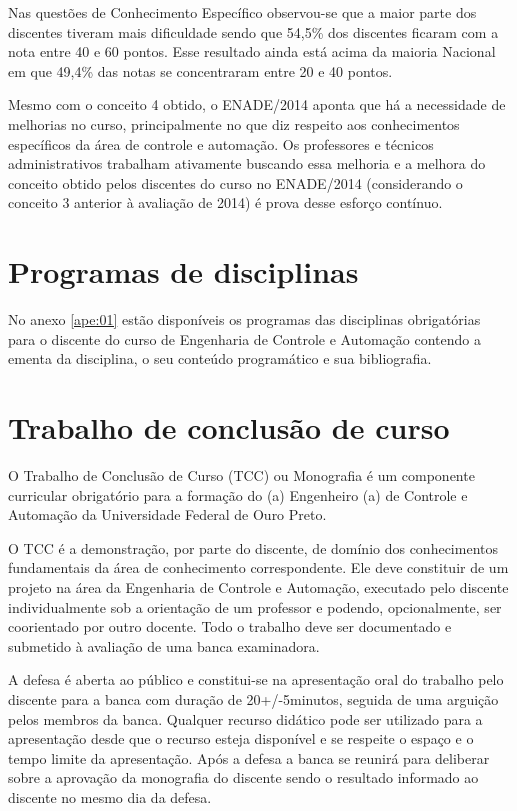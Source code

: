 \documentclass[
	12pt,				%
	openright,			%
	oneside,			%
	a4paper,			%
	english,			%
	brazil				%
	]{abntex2}
\begin{document}
Nas questões de Conhecimento Específico observou-se que a maior parte dos discentes tiveram mais dificuldade sendo que 54,5\% dos discentes ficaram com a nota entre 40 e 60 pontos. Esse resultado ainda está acima da maioria Nacional em que 49,4\% das notas se concentraram entre 20 e 40 pontos.

Mesmo com o conceito 4 obtido, o ENADE/2014 aponta que há a necessidade de melhorias no curso, principalmente no que diz respeito aos conhecimentos específicos da área de controle e automação. Os professores e técnicos administrativos trabalham ativamente buscando essa melhoria e a melhora do conceito obtido pelos discentes do curso no ENADE/2014 (considerando o conceito 3 anterior à avaliação de 2014) é prova desse esforço contínuo.

\section{Programas de disciplinas}
No anexo \ref{ape:01} estão disponíveis os programas das disciplinas obrigatórias para o discente do curso de Engenharia de Controle e Automação contendo a ementa da disciplina, o seu conteúdo programático e sua bibliografia.

\section{Trabalho de conclusão de curso}
O Trabalho de Conclusão de Curso (TCC) ou Monografia é um componente curricular obrigatório para a formação do (a) Engenheiro (a) de Controle e Automação da Universidade Federal de Ouro Preto.

O TCC é a demonstração, por parte do discente, de domínio dos conhecimentos fundamentais da área de conhecimento correspondente. Ele deve constituir de um projeto na área da Engenharia de Controle e Automação, executado pelo discente individualmente sob a orientação de um professor e podendo, opcionalmente, ser coorientado por outro docente. Todo o trabalho deve ser documentado e submetido à avaliação de uma banca examinadora.

A defesa é aberta ao público e constitui-se na apresentação oral do trabalho pelo discente para a banca com duração de 20+/-5minutos, seguida de uma arguição pelos membros da banca. Qualquer recurso didático pode ser utilizado para a apresentação desde que o recurso esteja disponível e se respeite o espaço e o tempo limite da apresentação. Após a defesa a banca se reunirá para deliberar sobre a aprovação da monografia do discente sendo o resultado informado ao discente no mesmo dia da defesa.
\end{document}
